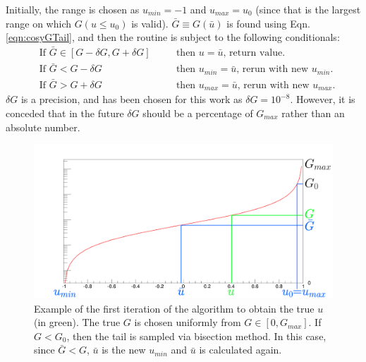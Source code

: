 Initially, the range is chosen as $u_{min}=-1$ and $u_{max}=u_0$ (since that is the largest range on which $G(u \leq u_0)$ is valid). $\bar{G} \equiv G(\bar{u})$ is found using Eqn. \ref{eqn:cosyGTail}, and then the routine is subject to the following conditionals:
\begin{align*}
&\text{If } \bar{G}\in [G-\delta G,G+\delta G] &\quad &\text{then } u=\bar{u}\text{, return value.}\\
&\text{If } \bar{G} < G-\delta G &\quad &\text{then } u_{min}=\bar{u} \text{, rerun with new }u_{min}.\\
&\text{If } \bar{G} > G+\delta G &\quad &\text{then } u_{max}=\bar{u} \text{, rerun with new }u_{max}.
\end{align*}
$\delta G$ is a precision, and has been chosen for this work as $\delta G = 10^{-8}$. However, it is conceded that in the future $\delta G$ should be a percentage of $G_{max}$ rather than an absolute number.

\begin{figure}
  \centering
    \includegraphics[width=\textwidth]{Figures/scatdist_algorithm} 
  \caption{Example of the first iteration of the algorithm to obtain the true $u$ (in green). The true $G$ is chosen uniformly from $G\in[0,G_{max}]$. If $G < G_0$, then the tail is sampled via bisection method. In this case, since $\bar{G} < G$, $\bar{u}$ is the new $u_{min}$ and $\bar{u}$ is calculated again.}
  \label{fig:scatdist_algorithm}
\end{figure}


